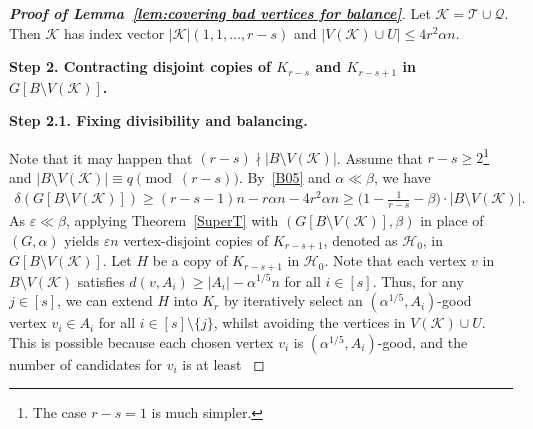 \documentclass[11pt, a4paper]{article}
\theoremstyle{definition}
\newcommand{\eps}{\varepsilon}
\newcommand{\<}{\subseteq}
\newcommand{\de}{\delta}
\begin{document}
\begin{proof}[{\bf Proof of Lemma~\ref{lem:covering bad vertices for balance}}]
Let $\mathcal{K}=\mathcal{T}\cup\mathcal{Q}$. Then $\mathcal{K}$ has index vector $|\mathcal{K}|(1,1,\ldots, r-s)$ and  $|V(\mathcal{K})\cup U|\leq 4r^2\alpha n$. %


\medskip
{\bf Step 2. Contracting disjoint copies of $K_{r-s}$ and $K_{r-s+1}$ in $G[B\setminus V(\mathcal{K})]$.}%
\medskip

\noindent \textbf {Step 2.1. Fixing divisibility and balancing.
}

Note that it may happen that $(r-s) \nmid |B \setminus V(\mathcal{K})|$. Assume that $r-s\ge2$\footnote{The case $r-s=1$ is much simpler.} and $|B\setminus V(\mathcal{K})|\equiv q \pmod{(r-s)}$. %
By~\ref{B05} and $\alpha\ll\beta$, we have
\begin{align}\label{mini-degree-K}
\de(G[B\setminus V(\mathcal{K})])\ge (r-s-1)n-r\alpha n-4r^2\alpha n\ge \Big(1-\frac{1}{r-s}-\beta\Big)\cdot|B\setminus V(\mathcal{K})|.
\end{align}
As $\eps\ll\beta$, applying Theorem~\ref{SuperT} with $(G[B \setminus V(\mathcal{K})],\beta)$ in place of $(G,\alpha)$ yields $\eps n$ vertex-disjoint copies of $K_{r-s+1}$, denoted as $\mathcal{H}_0$, in $G[B \setminus V(\mathcal{K})]$.  Let $H$ be a copy of $K_{r-s+1}$ in $\mathcal{H}_0$. %
Note that each vertex $v$ in $B\setminus V(\mathcal{K})$ satisfies $d(v,A_i)\ge |A_i|-\alpha^{1/5} n$ for all $i\in [s]$. 
{Thus, for any $j\in [s]$, we can extend $H$ into $K_r$ by iteratively select an $(\alpha^{1/5}, A_{i})$-good vertex $v_i\in A_i$ for all $i\in [s]\setminus\{j\}$, whilst avoiding the vertices in $V(\mathcal{K})\cup U$.}
{This is possible because each chosen vertex \(v_i\) is \((\alpha^{1/5},A_i)\)-good, and the number of candidates for \(v_i\) is at least
}
\end{proof}
\end{document}
